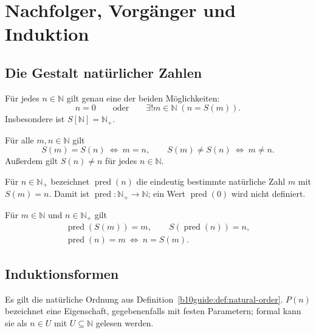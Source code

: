 \chapter{Nachfolger, Vorgänger und Induktion}
\label{b10guide:ch:induction}

\section{Die Gestalt natürlicher Zahlen}

\begin{theorem}
\label{b10guide:thm:zero-or-successor}
Für jedes $n\in\mathbb N$ gilt genau eine der beiden Möglichkeiten:
\[
 n=0
 \qquad\text{oder}\qquad
 \exists!m\in\mathbb N\;(n=S(m)).
\]
Insbesondere ist $S[\mathbb N]=\mathbb N_+$.
\end{theorem}

\begin{theorem}
\label{b10guide:thm:successor-comparison}
Für alle $m,n\in\mathbb N$ gilt
\[
 S(m)=S(n)\ \Longleftrightarrow\ m=n,
 \qquad
 S(m)\ne S(n)\ \Longleftrightarrow\ m\ne n.
\]
Außerdem gilt $S(n)\ne n$ für jedes $n\in\mathbb N$.
\end{theorem}

\begin{definition}
\label{b10guide:def:predecessor}
Für $n\in\mathbb N_+$ bezeichnet $\operatorname{pred}(n)$ die eindeutig
bestimmte natürliche Zahl $m$ mit $S(m)=n$. Damit ist
$\operatorname{pred}\colon\mathbb N_+\to\mathbb N$;
ein Wert $\operatorname{pred}(0)$ wird nicht definiert.
\end{definition}

\begin{theorem}
\label{b10guide:thm:predecessor}
Für $m\in\mathbb N$ und $n\in\mathbb N_+$ gilt
\[
 \begin{gathered}
 \operatorname{pred}(S(m))=m,\qquad S(\operatorname{pred}(n))=n,\\
 \operatorname{pred}(n)=m\ \Longleftrightarrow\ n=S(m).
 \end{gathered}
\]
\end{theorem}

\section{Induktionsformen}

Es gilt die natürliche Ordnung aus Definition~\ref{b10guide:def:natural-order}.
$P(n)$ bezeichnet eine Eigenschaft, gegebenenfalls mit festen Parametern;
formal kann sie als $n\in U$ mit $U\subseteq\mathbb N$ gelesen werden.

